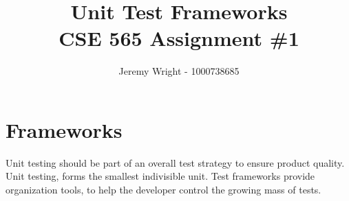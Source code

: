 \documentclass[12pt,journal]{article}
\newtheorem{mydef}{Definition}
\begin{document}
\doublespace
\title{Unit Test Frameworks \\ CSE 565 Assignment \#1}
\author{Jeremy Wright - 1000738685}

\maketitle

\section{Frameworks}
Unit testing should be part of an overall test strategy to
ensure product quality. Unit testing, forms the smallest indivisible unit. Test
frameworks provide organization tools, to help the developer control the growing
mass of tests.
%
%
\end{document}
